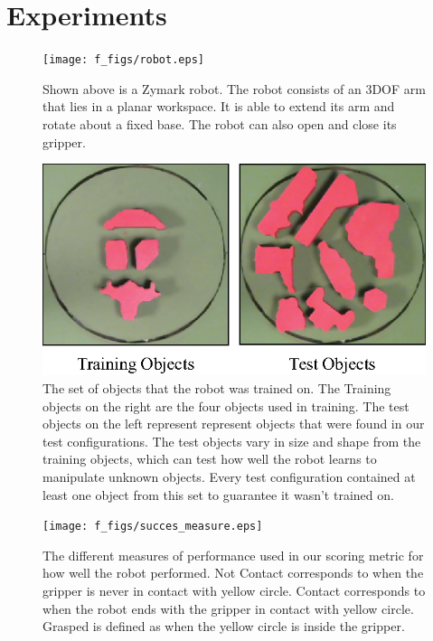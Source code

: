 \documentclass[10pt, conference]{ieeeconf}      %
\begin{document}
\section{Experiments} \label{sec:Exp}
\begin{figure}[t]
\centering

\texttt{[image: f\_figs/robot.eps]}

\caption{\footnotesize  Shown above is a Zymark robot. The robot consists of an 3DOF arm that lies in a planar workspace. It is able to extend its arm and rotate about a fixed base. The robot can also open and close its gripper.}

\label{fig:robot}
\end{figure}

\begin{figure}[t]
\centering
\includegraphics{f_figs/shapes_set.eps}

\caption{\footnotesize  The set of objects that the robot was trained on. The Training objects on the right are the four objects used in training. The test objects on the left represent represent objects that were found in our test configurations. The test objects vary in size and shape from the training objects, which can test how well the robot learns to manipulate unknown objects. Every test configuration contained at least one object from this set to guarantee it wasn't trained on.  }

\label{fig:shape_set}
\end{figure}


\begin{figure}[t]
\centering
\texttt{[image: f\_figs/succes\_measure.eps]}

\caption{\footnotesize  The different measures of performance used in our scoring metric for how well the robot performed.  Not  Contact corresponds to when the gripper is never in contact with yellow circle. Contact corresponds to when the robot ends with the gripper in contact with yellow circle. Grasped is defined as when the yellow circle is inside the gripper. }
\vspace*{-20pt}
\label{fig:suc_meas}
\end{figure}
\end{document}
